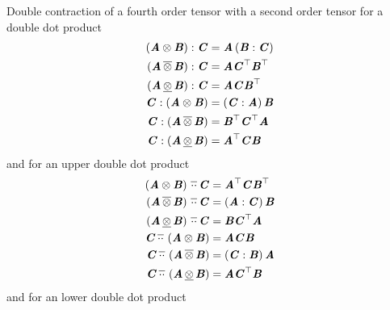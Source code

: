 Double contraction of a fourth order tensor with a second order tensor for a
double dot product
\begin{align}
   \left(  \boldsymbol{\mathit{A}} \otimes \boldsymbol{\mathit{B}}  \right) : \boldsymbol{\mathit{C}} &=\boldsymbol{\mathit{A}}\left(  \boldsymbol{\mathit{B}} : \boldsymbol{\mathit{C}}  \right)\\
   \left(  \boldsymbol{\mathit{A}} \, \overline{\otimes} \, \boldsymbol{\mathit{B}}  \right) : \boldsymbol{\mathit{C}} &=\boldsymbol{\mathit{A}} {\boldsymbol{\mathit{C}}}^{ \top }  {\boldsymbol{\mathit{B}}}^{ \top } \\
   \left(  \boldsymbol{\mathit{A}} \, \underline{\otimes} \, \boldsymbol{\mathit{B}}  \right) : \boldsymbol{\mathit{C}} &=\boldsymbol{\mathit{A}}\boldsymbol{\mathit{C}} {\boldsymbol{\mathit{B}}}^{ \top } \\
   \boldsymbol{\mathit{C}} : \left(  \boldsymbol{\mathit{A}} \otimes \boldsymbol{\mathit{B}}  \right) &=\left(  \boldsymbol{\mathit{C}} : \boldsymbol{\mathit{A}}  \right)\boldsymbol{\mathit{B}}\\
   \boldsymbol{\mathit{C}} : \left(  \boldsymbol{\mathit{A}} \, \overline{\otimes} \, \boldsymbol{\mathit{B}}  \right) &= {\boldsymbol{\mathit{B}}}^{ \top }  {\boldsymbol{\mathit{C}}}^{ \top } \boldsymbol{\mathit{A}}\\
   \boldsymbol{\mathit{C}} : \left(  \boldsymbol{\mathit{A}} \, \underline{\otimes} \, \boldsymbol{\mathit{B}}  \right) &= {\boldsymbol{\mathit{A}}}^{ \top } \boldsymbol{\mathit{C}}\boldsymbol{\mathit{B}}
\end{align}
and for an upper double dot product
\begin{align}
   \left(  \boldsymbol{\mathit{A}} \otimes \boldsymbol{\mathit{B}}  \right) \, \overline{\cdot\cdot} \, \boldsymbol{\mathit{C}} &= {\boldsymbol{\mathit{A}}}^{ \top } \boldsymbol{\mathit{C}} {\boldsymbol{\mathit{B}}}^{ \top } \\
   \left(  \boldsymbol{\mathit{A}} \, \overline{\otimes} \, \boldsymbol{\mathit{B}}  \right) \, \overline{\cdot\cdot} \, \boldsymbol{\mathit{C}} &=\left(  \boldsymbol{\mathit{A}} : \boldsymbol{\mathit{C}}  \right)\boldsymbol{\mathit{B}}\\
   \left(  \boldsymbol{\mathit{A}} \, \underline{\otimes} \, \boldsymbol{\mathit{B}}  \right) \, \overline{\cdot\cdot} \, \boldsymbol{\mathit{C}} &=\boldsymbol{\mathit{B}} {\boldsymbol{\mathit{C}}}^{ \top } \boldsymbol{\mathit{A}}\\
   \boldsymbol{\mathit{C}} \, \overline{\cdot\cdot} \, \left(  \boldsymbol{\mathit{A}} \otimes \boldsymbol{\mathit{B}}  \right) &=\boldsymbol{\mathit{A}}\boldsymbol{\mathit{C}}\boldsymbol{\mathit{B}}\\
   \boldsymbol{\mathit{C}} \, \overline{\cdot\cdot} \, \left(  \boldsymbol{\mathit{A}} \, \overline{\otimes} \, \boldsymbol{\mathit{B}}  \right) &=\left(  \boldsymbol{\mathit{C}} : \boldsymbol{\mathit{B}}  \right)\boldsymbol{\mathit{A}}\\
   \boldsymbol{\mathit{C}} \, \overline{\cdot\cdot} \, \left(  \boldsymbol{\mathit{A}} \, \underline{\otimes} \, \boldsymbol{\mathit{B}}  \right) &=\boldsymbol{\mathit{A}} {\boldsymbol{\mathit{C}}}^{ \top } \boldsymbol{\mathit{B}}
\end{align}
and for an lower double dot product

